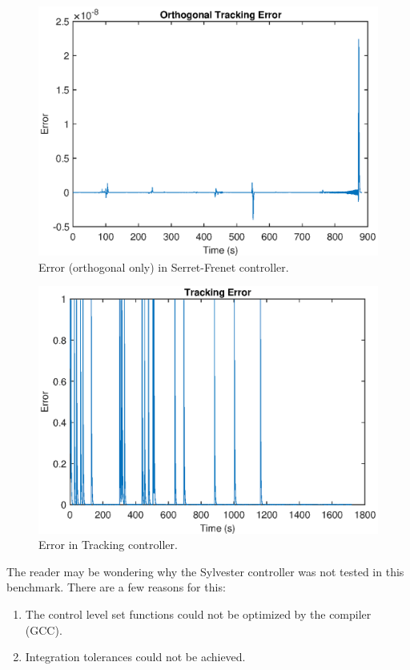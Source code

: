 \begin{figure}[!htbp]
    \centering
    \includegraphics{images/campus_serret_frenet_error.eps}
    \caption{Error (orthogonal only) in Serret-Frenet controller.}
    \label{fig:mock_campus_serret_frenet_error}
\end{figure}
\begin{figure}[!htbp]
    \centering
    \includegraphics{images/campus_tracking_error.eps}
    \caption{Error in Tracking controller.}
    \label{fig:mock_campus_tracking_error}
\end{figure}
The reader may be wondering why the Sylvester controller was not tested in this benchmark. There are a few reasons for this:
\begin{enumerate}
    \item The control level set functions could not be optimized by the compiler (GCC).
    \item Integration tolerances could not be achieved.
\end{enumerate}
